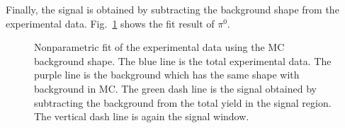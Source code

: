 Finally, the signal is obtained by subtracting the background shape from the experimental data. Fig.~\ref{fig:pi0_fit} shows the fit result of $\pi^0$.  
\begin{figure}[H]
  \centering     
  \caption{Nonparametric fit of the experimental data using the MC background shape. The blue line is the total experimental data. The purple line is the background which has the same shape with background in MC. The green dash line is the signal obtained by subtracting the background from the total yield in the signal region. The vertical dash line is again the signal window. }
  \label{fig:pi0_fit}
\end{figure}

